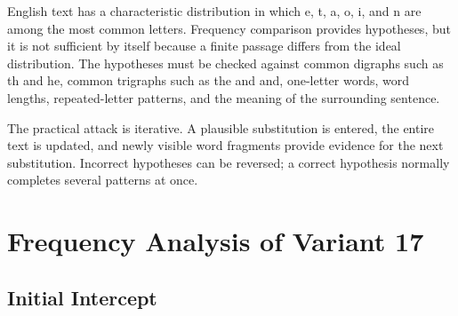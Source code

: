 \documentclass[12pt,a4paper]{article}
\begin{document}
English text has a characteristic distribution in which e, t, a, o, i, and n are among the most common letters. Frequency comparison provides hypotheses, but it is not sufficient by itself because a finite passage differs from the ideal distribution. The hypotheses must be checked against common digraphs such as th and he, common trigraphs such as the and and, one-letter words, word lengths, repeated-letter patterns, and the meaning of the surrounding sentence.

The practical attack is iterative. A plausible substitution is entered, the entire text is updated, and newly visible word fragments provide evidence for the next substitution. Incorrect hypotheses can be reversed; a correct hypothesis normally completes several patterns at once.

\newpage
\section{Frequency Analysis of Variant 17}

\subsection{Initial Intercept}
\end{document}
